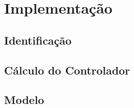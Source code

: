 %

\chapter{Implementação}

\section{Identificação}

\section{Cálculo do Controlador}

\section{Modelo}

%

